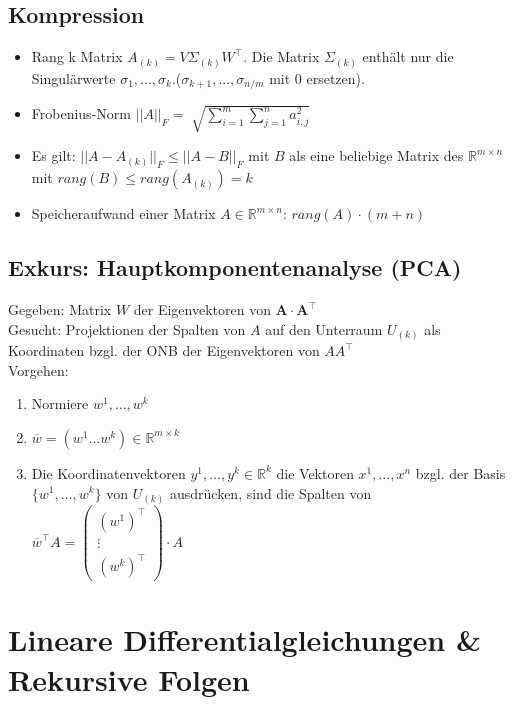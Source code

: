 \documentclass[german, 6pt]{latex4ei/latex4ei_sheet}
\begin{document}
\begin{minipage}{\columnwidth}
\subsection{Kompression}
\begin{itemize}\itemsep0pt
\item Rang k Matrix $A_{(k)}=V\Sigma_{(k)}W^\top$. Die Matrix $\Sigma_{(k)}$ enthält nur die Singulärwerte $\sigma_1, ...,\sigma_k$.\qquad ($\sigma_{k+1}, ...,\sigma_{n/m}$ mit 0 ersetzen).\\
\item Frobenius-Norm $|| A ||_F = \sqrt[]{\sum_{i=1}^{m} \sum_{j=1}^{n} {a^{2}_{i,j}}}$\\
\item Es gilt: $|| A-A_{(k)} ||_F \leq || A-B ||_F$ mit $B$ als eine beliebige Matrix des $\mathbb{R}^{m\times n}$ mit $rang(B) \leq rang(A_{(k)}) = k$
\item Speicheraufwand einer Matrix $A\in \mathbb{R}^{m\times n}$: $rang(A) \cdot (m+n)$
\end{itemize}
\end{minipage}
\subsection{Exkurs: Hauptkomponentenanalyse (PCA)}
Gegeben: Matrix $W$ der Eigenvektoren von $\mathbf{A\cdot A^\top}$\\
Gesucht: Projektionen der Spalten von $A$ auf den Unterraum $U_{(k)}$ als Koordinaten bzgl. der ONB der Eigenvektoren von $AA^\top$\\
Vorgehen: 
\begin{enumerate}
	\item Normiere $w^1, \dots , w^k$
	\item $\overline{w}=(w^1 \dots w^k)\in \mathbb{R}^{m\times k}$
	\item Die Koordinatenvektoren $y^1, \dots , y^k \in \mathbb{R}^{k}$ die Vektoren $x^1,\dots , x^n$ bzgl. der Basis $\{w^1, \dots , w^k\}$ von $U_{(k)}$ ausdrücken, sind die Spalten von\\
	$\overline{w}^\top A=\begin{pmatrix}
	(w^{1})^{\top} \\
	\vdots \\
	(w^{k})^{\top}
	\end{pmatrix}
	\cdot A$
\end{enumerate}
\section{Lineare Differentialgleichungen \& Rekursive Folgen}
\end{document}
